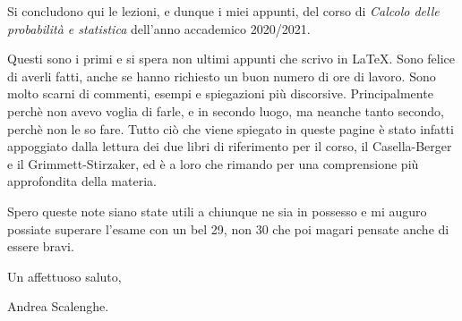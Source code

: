 \documentclass{book}
\theoremstyle{remark}
\theoremstyle{proposition}
\theoremstyle{definition}
\begin{document}
\newpage

\setcounter{secnumdepth}{-1}


Si concludono qui le lezioni, e dunque i miei appunti, del corso di \textit{Calcolo delle probabilità e statistica} dell'anno accademico 2020/2021. 

Questi sono i primi e si spera non ultimi appunti che scrivo in {\LaTeX}. Sono felice di averli fatti, anche se hanno richiesto un buon numero di ore di lavoro. Sono molto scarni di commenti, esempi e spiegazioni più discorsive. Principalmente perchè non avevo voglia di farle, e in secondo luogo, ma neanche tanto secondo, perchè non le so fare. Tutto ciò che viene spiegato in queste pagine è stato infatti appoggiato dalla lettura dei due libri di riferimento per il corso, il Casella-Berger e il Grimmett-Stirzaker, ed è a loro che rimando per una comprensione più approfondita della materia.

Spero queste note siano state utili a chiunque ne sia in possesso e mi auguro possiate superare l'esame con un bel 29, non 30 che poi magari pensate anche di essere bravi. 

Un affettuoso saluto,

\vspace{5px}
\noindent
Andrea Scalenghe.
\end{document}
